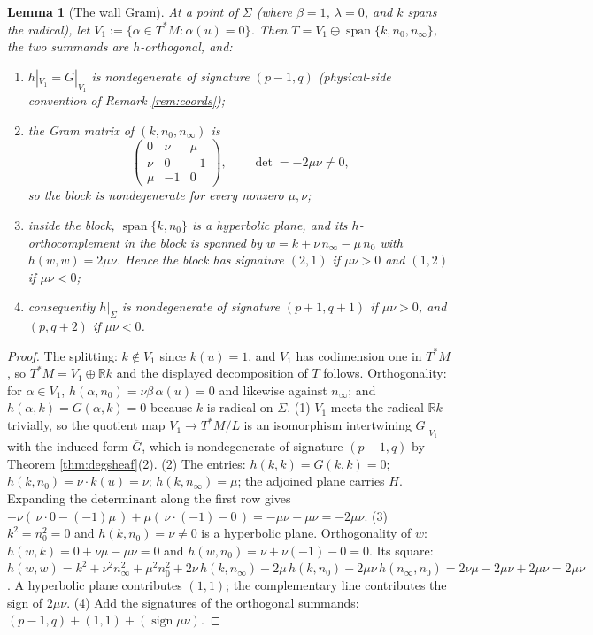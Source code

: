 \documentclass[11pt]{article}
\newtheorem{lemma}[theorem]{Lemma}
\theoremstyle{definition}
\newcommand{\R}{\mathbb{R}}
\newcommand{\shL}{L}
\newcommand{\Sig}{\Sigma}
\newcommand{\nO}{n_0}
\newcommand{\nInf}{n_\infty}
\begin{document}
\begin{lemma}[The wall Gram]\label{lem:wallgram}
At a point of $\Sig$ (where $\beta = 1$, $\lambda = 0$, and $k$ spans the radical), let $V_1 := \{\alpha \in T^*M : \alpha(u) = 0\}$. Then $T = V_1 \oplus \operatorname{span}\{k, \nO, \nInf\}$, the two summands are $h$-orthogonal, and:
\begin{enumerate}
\item $h|_{V_1} = G|_{V_1}$ is nondegenerate of signature $(p{-}1, q)$ (physical-side convention of Remark \ref{rem:coords});
\item the Gram matrix of $(k, \nO, \nInf)$ is
\[
\begin{pmatrix} 0 & \nu & \mu \\ \nu & 0 & -1 \\ \mu & -1 & 0 \end{pmatrix},
\qquad \det = -2\mu\nu \neq 0 ,
\]
so the block is nondegenerate for every nonzero $\mu, \nu$;
\item inside the block, $\operatorname{span}\{k, \nO\}$ is a hyperbolic plane, and its $h$-orthocomplement in the block is spanned by $w = k + \nu\,\nInf - \mu\,\nO$ with $h(w,w) = 2\mu\nu$. Hence the block has signature $(2,1)$ if $\mu\nu > 0$ and $(1,2)$ if $\mu\nu < 0$;
\item consequently $h|_\Sig$ is nondegenerate of signature $(p{+}1, q{+}1)$ if $\mu\nu > 0$, and $(p, q{+}2)$ if $\mu\nu < 0$.
\end{enumerate}
\end{lemma}

\begin{proof}
The splitting: $k \notin V_1$ since $k(u) = 1$, and $V_1$ has codimension one in $T^*M$, so $T^*M = V_1 \oplus \R k$ and the displayed decomposition of $T$ follows. Orthogonality: for $\alpha \in V_1$, $h(\alpha, \nO) = \nu\beta\,\alpha(u) = 0$ and likewise against $\nInf$; and $h(\alpha, k) = G(\alpha, k) = 0$ because $k$ is radical on $\Sig$. (1) $V_1$ meets the radical $\R k$ trivially, so the quotient map $V_1 \to T^*M/\shL$ is an isomorphism intertwining $G|_{V_1}$ with the induced form $\overline{G}$, which is nondegenerate of signature $(p{-}1,q)$ by Theorem \ref{thm:degsheaf}(2). (2) The entries: $h(k,k) = G(k,k) = 0$; $h(k, \nO) = \nu \cdot k(u) = \nu$; $h(k, \nInf) = \mu$; the adjoined plane carries $H$. Expanding the determinant along the first row gives $-\nu(\,\nu \cdot 0 - (-1)\mu\,) + \mu(\,\nu \cdot (-1) - 0\,) = -\mu\nu - \mu\nu = -2\mu\nu$. (3) $k^2 = \nO^2 = 0$ and $h(k, \nO) = \nu \neq 0$ is a hyperbolic plane. Orthogonality of $w$: $h(w, k) = 0 + \nu\mu - \mu\nu = 0$ and $h(w, \nO) = \nu + \nu(-1) - 0 = 0$. Its square: $h(w,w) = k^2 + \nu^2 \nInf^2 + \mu^2 \nO^2 + 2\nu\,h(k,\nInf) - 2\mu\,h(k,\nO) - 2\mu\nu\,h(\nInf,\nO) = 2\nu\mu - 2\mu\nu + 2\mu\nu = 2\mu\nu$. A hyperbolic plane contributes $(1,1)$; the complementary line contributes the sign of $2\mu\nu$. (4) Add the signatures of the orthogonal summands: $(p{-}1, q) + (1,1) + (\operatorname{sign} \mu\nu)$.
\end{proof}
\end{document}
